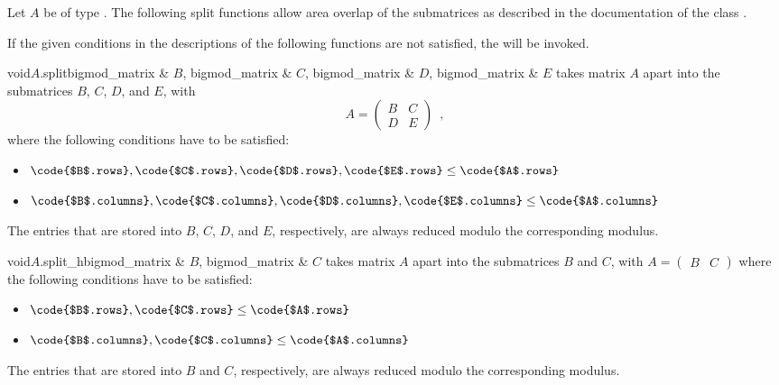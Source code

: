 Let $A$ be of type .  The following split functions allow area overlap of
the submatrices as described in the documentation of the class .

If the given conditions in the descriptions of the following functions are not satisfied, the
\LEH will be invoked.

\begin{cfcode}{void}{$A$.split}{bigmod_matrix & $B$, bigmod_matrix & $C$, bigmod_matrix & $D$, bigmod_matrix & $E$}
  takes matrix $A$ apart into the submatrices $B$, $C$, $D$, and $E$, with
  \begin{displaymath}
    A = \begin{pmatrix}
      B & C \\
      D & E
    \end{pmatrix}\enspace,
  \end{displaymath}
  where the following conditions have to be satisfied:
  \begin{itemize}
  \item $\code{$B$.rows}, \code{$C$.rows}, \code{$D$.rows}, \code{$E$.rows} \leq
    \code{$A$.rows}$
  \item $\code{$B$.columns}, \code{$C$.columns}, \code{$D$.columns}, \code{$E$.columns} \leq
    \code{$A$.columns}$
  \end{itemize}
  The entries that are stored into $B$, $C$, $D$, and $E$, respectively, are always reduced
  modulo the corresponding modulus.
\end{cfcode}

\begin{cfcode}{void}{$A$.split_h}{bigmod_matrix & $B$, bigmod_matrix & $C$}
  takes matrix $A$ apart into the submatrices $B$ and $C$, with $A = \begin{pmatrix} B & C
  \end{pmatrix}$ where the following conditions have to be satisfied:
  \begin{itemize}
  \item $\code{$B$.rows}, \code{$C$.rows} \leq \code{$A$.rows}$
  \item $\code{$B$.columns}, \code{$C$.columns} \leq \code{$A$.columns}$
  \end{itemize}
  The entries that are stored into $B$ and $C$, respectively, are always reduced modulo the
  corresponding modulus.
\end{cfcode}

